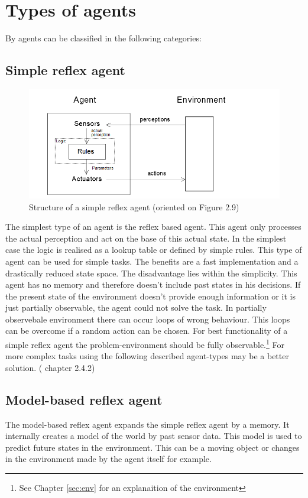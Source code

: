 \documentclass[10pt,a4paper,DIV=11]{scrreprt}
\begin{document}
\section{Types of agents}
By \cite{ai} agents can be classified in the following categories:
\subsection{Simple reflex agent}


\begin{center}
	\begin{figure}[H]
		\centering
		\includegraphics[width=1.0\textwidth,scale=1]{files/Reflexagent.png}  
		\caption{Structure of a simple reflex agent (oriented on \cite{ai} Figure 2.9)} 
		\label{fig:agentr}
	\end{figure}
\end{center}

The simplest type of an agent is the reflex based agent.
This agent only processes the actual perception and act on the base of this actual state. In the simplest case the logic is realised as a lookup table or defined by simple rules. This type of agent can be used for simple tasks. The benefits are a fast implementation and a drastically reduced state space.
The disadvantage lies within the simplicity. This agent has no memory and therefore doesn't include past states in his decisions. If the present state of the environment doesn't provide enough information or it is just partially observable, the agent could not solve the task.
In partially observebale environment there can occur loops of wrong behaviour. This loops can be overcome if a random action can be chosen.
For best functionality of a simple reflex agent the problem-environment should be fully observable.\footnote{See Chapter \ref{sec:env} for an explanaition of the environment}
For more complex tasks using the following described agent-types may be a better solution.
(\cite{ai} chapter 2.4.2)
\subsection{Model-based reflex agent}
The model-based reflex agent expands the simple reflex agent by a memory. It internally creates a model of the world by past sensor data. This model is used to predict future states in the environment.
This can be a moving object or changes in the environment made by the agent itself for example.
\end{document}
